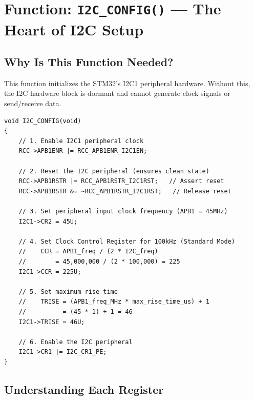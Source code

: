 \documentclass[12pt, a4paper]{article}
\begin{document}
\section{Function: \texttt{I2C\_CONFIG()} --- The Heart of I2C Setup}

\subsection{Why Is This Function Needed?}

This function initializes the STM32's I2C1 peripheral hardware. Without this, the I2C hardware block is dormant and cannot generate clock signals or send/receive data.

\begin{codebox}
\begin{lstlisting}[style=CStyle]
void I2C_CONFIG(void)
{
    // 1. Enable I2C1 peripheral clock
    RCC->APB1ENR |= RCC_APB1ENR_I2C1EN;

    // 2. Reset the I2C peripheral (ensures clean state)
    RCC->APB1RSTR |= RCC_APB1RSTR_I2C1RST;   // Assert reset
    RCC->APB1RSTR &= ~RCC_APB1RSTR_I2C1RST;   // Release reset

    // 3. Set peripheral input clock frequency (APB1 = 45MHz)
    I2C1->CR2 = 45U;

    // 4. Set Clock Control Register for 100kHz (Standard Mode)
    //    CCR = APB1_freq / (2 * I2C_freq)
    //        = 45,000,000 / (2 * 100,000) = 225
    I2C1->CCR = 225U;

    // 5. Set maximum rise time
    //    TRISE = (APB1_freq_MHz * max_rise_time_us) + 1
    //          = (45 * 1) + 1 = 46
    I2C1->TRISE = 46U;

    // 6. Enable the I2C peripheral
    I2C1->CR1 |= I2C_CR1_PE;
}
\end{lstlisting}
\end{codebox}

\subsection{Understanding Each Register}
\end{document}
